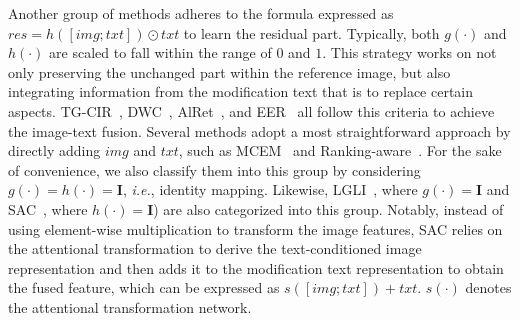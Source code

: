 Another group of methods adheres to the formula expressed as \underline{$\mathit{res} = h\left( \left[\mathit{img};\mathit{txt}\right] \right) \odot \mathit{txt}$} to learn the residual part. Typically, both $g\left(\cdot\right)$ and $h\left(\cdot\right)$ are scaled to fall within the range of $0$ and $1$. This strategy works on not only preserving the unchanged part within the reference image, but also integrating information from the modification text that is to replace certain aspects. TG-CIR~\cite{wen2023tgcir}, DWC~\cite{huang2024dwc}, AlRet~\cite{xu2024alret}, and EER~\cite{zhang2022eer} all follow this criteria to achieve the image-text fusion. Several methods adopt a most straightforward approach by directly adding $\mathit{img}$ and $\mathit{txt}$, such as MCEM~\cite{zhang2024mcem} and Ranking-aware~\cite{chen2023ranking}. For the sake of convenience, we also classify them into this group by considering $g\left(\cdot\right) = h\left(\cdot\right) = \mathbf{I}$, \textit{i.e.}, identity mapping. 
Likewise, LGLI~\cite{huang2023lgli}, where $g\left(\cdot\right) = \mathbf{I}$ and SAC~\cite{jandial2022sac}, where $h\left(\cdot\right) = \mathbf{I}$) are also categorized into this group. Notably, instead of using element-wise multiplication to transform the image features, SAC relies on the attentional transformation to derive the text-conditioned image representation and then adds it to the modification text representation to obtain the fused feature, which can be expressed as $s\left( \left[\mathit{img};\mathit{txt}\right] \right) + \mathit{txt}$. $s\left(\cdot\right)$ denotes the attentional transformation network. 



